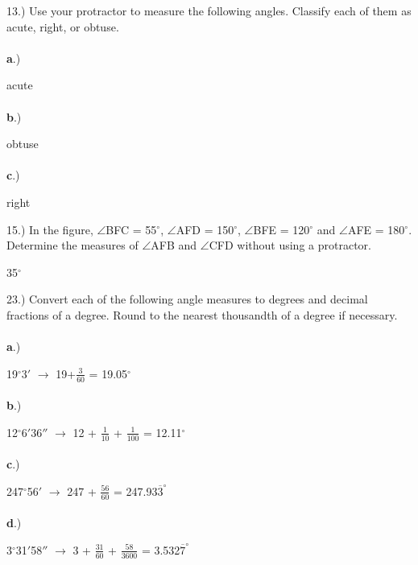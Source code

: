 \documentclass[12pt]{article}
\begin{document}
{\setlength{\parindent}{0cm}
13.) Use your protractor to measure the following angles. Classify each of them as acute, right, or obtuse. \paragraph{}\textbf{a}.) \begin{center} acute \end{center}
\paragraph{}\textbf{b}.) \begin{center} obtuse \end{center}
\paragraph{}\textbf{c}.) \begin{center} right \end{center}
}
{\setlength{\parindent}{0cm}
15.) In the figure, $\angle$\textsc{BFC} = 55$^{\circ}$,  $\angle$\textsc{AFD} = 150$^{\circ}$,  $\angle$\textsc{BFE} = 120$^{\circ}$ and  $\angle$\textsc{AFE} = 180$^{\circ}$. Determine the measures of $\angle$\textsc{AFB} and $\angle$\textsc{CFD} without using a protractor.\begin{center} 35$^{\circ}$ \end{center}
}
{\setlength{\parindent}{0cm}
23.) Convert each of the following angle measures to degrees and decimal fractions of a degree. Round to the nearest thousandth of a  degree if necessary. \paragraph{}\textbf{a}.) \begin{center} 19$^{\circ}$3$'$ $\longrightarrow$ 19+$\frac{3}{60}$ = 19.05$^{\circ}$\end{center}
\paragraph{}\textbf{b}.) \begin{center}  12$^{\circ}$6$'$36$''$ $\longrightarrow$ 12 + $\frac{1}{10}$ + $\frac{1}{100}$ = 12.11$^{\circ}$ \end{center}
\paragraph{}\textbf{c}.) \begin{center} 247$^{\circ}$56$'$ $\longrightarrow$ 247 + $\frac{56}{60}$ = 247.93$\overline{3}^{\circ}$ \end{center}
\paragraph{}\textbf{d}.) \begin{center} 3$^{\circ}$31$'$58$''$ $\longrightarrow$ 3 + $\frac{31}{60}$ + $\frac{58}{3600}$ = 3.532$\overline{7}^{\circ}$ \end{center}
}
\end{document}
